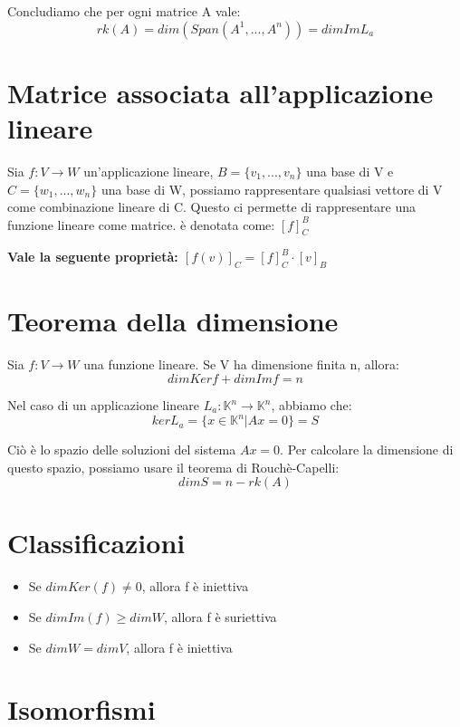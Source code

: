\documentclass[a4paper, 10pt]{article}
\begin{document}
Concludiamo che per ogni matrice A vale:
$$rk(A) = dim(Span(A^1, ..., A^n)) = dimImL_a$$
\fi

\section{Matrice associata all'applicazione lineare}

Sia $f: V \rightarrow W$ un'applicazione lineare, $B=\{v_1, ..., v_n\}$ una base di V e $C=\{w_1, ..., w_n\}$ una base di W, possiamo rappresentare qualsiasi vettore di V come combinazione lineare di C. Questo ci permette di rappresentare una funzione lineare come matrice. è denotata come: $[f]_C^B$


\textbf{Vale la seguente proprietà: $[f(v)]_C = [f]_C^B \cdot [v]_B$}

\section{Teorema della dimensione}

Sia $f: V \rightarrow W$ una funzione lineare. Se V ha dimensione finita n, allora:
$$dimKerf+dimImf=n$$

Nel caso di un applicazione lineare $L_a: \mathbb{K}^n \rightarrow \mathbb{K}^n$, abbiamo che:
$$kerL_a=\{x \in \mathbb{K}^n | Ax = 0\} = S$$

Ciò è lo spazio delle soluzioni del sistema $Ax = 0$. Per calcolare la dimensione di questo spazio, possiamo usare il teorema di Rouchè-Capelli:
$$dimS = n - rk(A)$$

\section{Classificazioni}
\begin{itemize}
	\item Se $dimKer(f) \neq 0$, allora f è iniettiva
	\item Se $dimIm(f) \geq dimW$, allora f è suriettiva
	\item Se $dimW = dimV$, allora f è iniettiva
\end{itemize}

\section{Isomorfismi}
\end{document}
